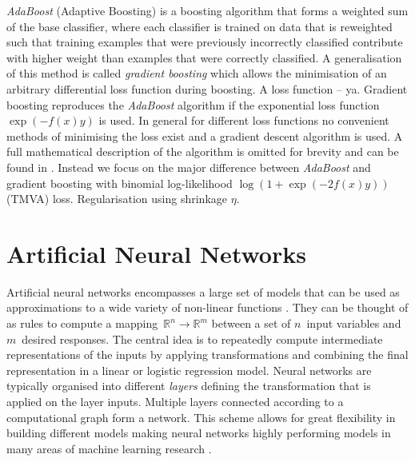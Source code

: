 
\emph{AdaBoost} (Adaptive Boosting) is a boosting algorithm that forms a
weighted sum of the base classifier, where each classifier is trained on data
that is reweighted such that training examples that were previously incorrectly
classified contribute with higher weight than examples that were correctly
classified.  A generalisation of this method is called \emph{gradient boosting}
which allows the minimisation of an arbitrary differential loss function during
boosting. A loss function -- ya. Gradient boosting reproduces the
\emph{AdaBoost} algorithm if the exponential loss function $\exp(-f(x) y)$ is
used. In general for different loss functions no convenient methods of
minimising the loss exist and a gradient descent algorithm is used. A full
mathematical description of the algorithm is omitted for brevity and can be
found in \cite{friedman_gbm, esl}. Instead we focus on the major difference
between \emph{AdaBoost} and gradient boosting with binomial log-likelihood
$\log\left( 1 + \exp(-2 f(x) y) \right)$ (TMVA) loss. Regularisation using
shrinkage $\eta$.


\section{Artificial Neural Networks}
\label{sec:nn}

Artificial neural networks encompasses a large set of models that can be used as
approximations to a wide variety of non-linear functions \cite{hornik}. They can
be thought of as rules to compute a
mapping~\mbox{$\mathbb{R}^n \rightarrow \mathbb{R}^m$} between a set of
$n$~input variables and $m$~desired responses. The central idea is to repeatedly
compute intermediate representations of the inputs by applying transformations
and combining the final representation in a linear or logistic regression model.
Neural networks are typically organised into different \emph{layers} defining
the transformation that is applied on the layer inputs. Multiple layers
connected according to a computational graph form a network. This scheme allows
for great flexibility in building different models making neural networks highly
performing models in many areas of machine learning research .


